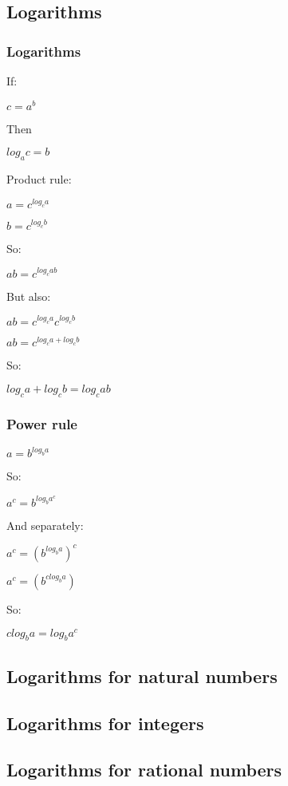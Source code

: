 \subsection{Logarithms}

\subsubsection{Logarithms}

If:

\(c=a^b\)

Then

\(log_ac=b\)

Product rule:

\(a=c^{log_ca }\)

\(b=c^{log_cb }\)

So:

\(ab=c^{log_cab }\)

But also:

\(ab=c^{log_ca }c^{log_cb }\)

\(ab=c^{log_ca + log_cb }\)

So:

\(log_ca+log_cb=log_cab\)

\subsubsection{Power rule}

\(a=b^{log_ba}\)

So:

\(a^c=b^{log_ba^c}\)

And separately:

\(a^c=(b^{log_ba})^c\)

\(a^c=(b^{clog_ba})\)

So:

\(clog_ba=log_ba^c\)

\subsection{Logarithms for natural numbers}

\subsection{Logarithms for integers}

\subsection{Logarithms for rational numbers}

